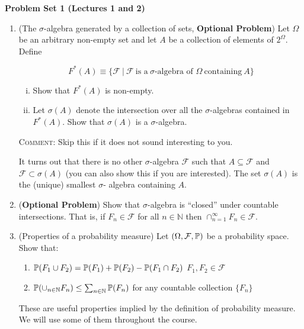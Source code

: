 \documentclass[11pt]{article} %
\begin{document}
\onehalfspace

\textbf{Problem Set 1 (Lectures 1 and 2)}

\begin{enumerate}
\item (The $\sigma$-algebra generated by a collection of sets, \textbf{Optional Problem}) Let $\Omega$ be an arbitrary non-empty set and let $A$ be a collection of elements of $2^\Omega$.  Define 

$$F^*(A) \equiv \{\mathcal{F} \: | \: \mathcal{F} \: \text{is a} \: \sigma\text{-algebra of } \Omega \: \text{containing} \: A\} $$

\begin{enumerate}[i)]
\item Show that $F^*(A)$ is non-empty. 
\item Let $\sigma(A)$ denote the intersection over all the $\sigma$-algebras contained in $F^*(A)$. Show that $\sigma(A)$ is a $\sigma$-algebra.
\end{enumerate}

{\scshape Comment:} Skip this if it does not sound interesting to you. 

 It turns out that there is no other $\sigma$-algebra  $\mathcal{F}$ such that $A \subseteq \mathcal{F}$ and $\mathcal{F} \subset \sigma(A)$ (you can also show this if you are interested). The set $\sigma(A)$ is the (unique) smallest $\sigma$- algebra containing $A$.\\

\item  (\textbf{Optional Problem}) Show that $\sigma$-algebra is ``closed'' under countable intersections. That is, if $F_n \in \mathcal{F}$ for all $n\in\mathbb{N}$ then $\cap_{n=1}^\infty F_n \in \mathcal{F}$.



\item (Properties of a probability measure) Let $(\Omega, \mathcal{F}, \mathbb{P})$ be a probability space. Show that:
\begin{enumerate}
\item $\mathbb{P}(F_1 \cup F_2) = \mathbb{P}(F_1) + \mathbb{P}(F_2) - \mathbb{P}(F_1 \cap F_2)$  $F_1,F_2 \in \mathcal{F}$
\item $\mathbb{P}(\cup_{n \in \mathbb{N}} F_n) \leq \sum_{n \in \mathbb{N}} \mathbb{P}(F_n) $ for any countable collection $\{F_n\}$
\end{enumerate}

 These are useful properties implied by the definition of probability measure. We will use some of them throughout the course. 


\end{enumerate}
\end{document}
